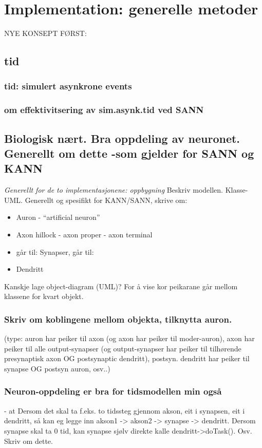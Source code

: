 
\section{Implementation: generelle metoder}
	NYE KONSEPT FØRST:
	\subsection{tid}
		\subsubsection{tid: simulert asynkrone events}
		\subsubsection{om effektivitsering av sim.asynk.tid ved SANN}

	
	\subsection{Biologisk nært. Bra oppdeling av neuronet. Generellt om dette -som gjelder for SANN og KANN}
		\emph{Generellt for de to implementasjonene: oppbygning}
			Beskriv modellen. Klasse-UML. Generellt og spesifikt for KANN/SANN, skrive om:
			\begin{itemize}
				\item Auron - ``artificial neuron''
				\item Axon hillock - axon proper - axon terminal
				\item går til: Synapser, går til:
				\item Dendritt
			\end{itemize}

			Kanskje lage object-diagram (UML)? For å vise kor peikarane går mellom klassene for kvart objekt.

		\subsubsection{Skriv om koblingene mellom objekta, tilknytta auron.}
			(type: auron har peiker til axon (og axon har peiker til moder-auron), axon har peiker til alle output-synapser (og output-synapser har peiker til tilhørende presynaptisk axon OG postsynaptic dendritt), 
			postsyn. dendritt har peiker til synapse OG postsyn auron, osv..)

	 	\subsubsection{Neuron-oppdeling er bra for tidsmodellen min også}
			- at Dersom det skal ta f.eks. to tidssteg gjennom akson, eit i synapsen, eit i dendritt, så kan eg legge inn akson1 -> akson2 -> synapse -> dendritt. 
			Dersom synapse skal ta 0 tid, kan synapse sjølv direkte kalle dendritt->doTask(). Osv. Skriv om dette.

